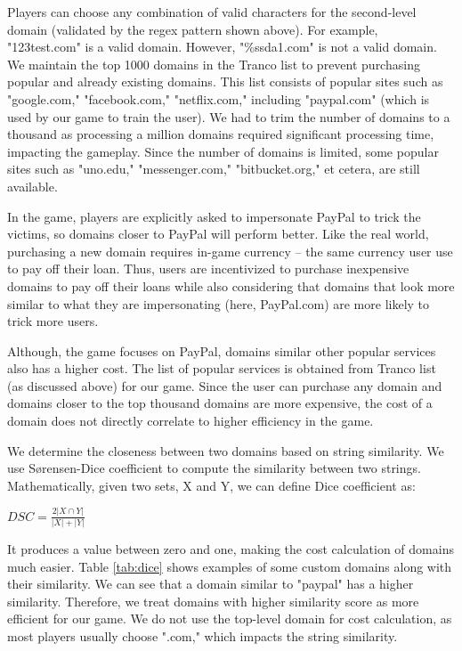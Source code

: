 Players can choose any combination of valid characters for the second-level domain (validated by the regex pattern shown above). For example, "123test.com" is a valid domain. However, "\%ssda1.com" is not a valid domain. We maintain the top 1000 domains in the Tranco list to prevent purchasing popular and already existing domains. This list consists of popular sites such as "google.com," "facebook.com," "netflix.com," including "paypal.com" (which is used by our game to train the user). We had to trim the number of domains to a thousand as processing a million domains required significant processing time, impacting the gameplay. Since the number of domains is limited, some popular sites such as "uno.edu," "messenger.com," "bitbucket.org," et cetera, are still available.

In the game, players are explicitly asked to impersonate PayPal to trick the victims, so domains closer to PayPal will perform better. Like the real world, purchasing a new domain requires in-game currency -- the same currency user use to pay off their loan. Thus, users are incentivized to purchase inexpensive domains to pay off their loans while also considering that domains that look more similar to what they are impersonating (here, PayPal.com) are more likely to trick more users.

Although, the game focuses on PayPal, domains similar other popular services also has a higher cost. The list of popular services is obtained from Tranco list (as discussed above) for our game. Since the user can purchase any domain and domains closer to the top thousand domains are more expensive,  the cost of a domain does not directly correlate to higher efficiency in the game.

We determine the closeness between two domains based on string similarity. We use Sørensen-Dice coefficient to compute the similarity between two strings. Mathematically, given two sets, X and Y, we can define Dice coefficient as:

\begin{center}
    \begin{math}
        DSC = \frac{2|X \cap Y|}{|X|+|Y|}
    \end{math}
\end{center}

It produces a value between zero and one, making the cost calculation of domains much easier. Table \ref{tab:dice} shows examples of some custom domains along with their similarity. We can see that a domain similar to "paypal" has a higher similarity. Therefore, we treat domains with higher similarity score as more efficient for our game. We do not use the top-level domain for cost calculation, as most players usually choose ".com," which impacts the string similarity.

